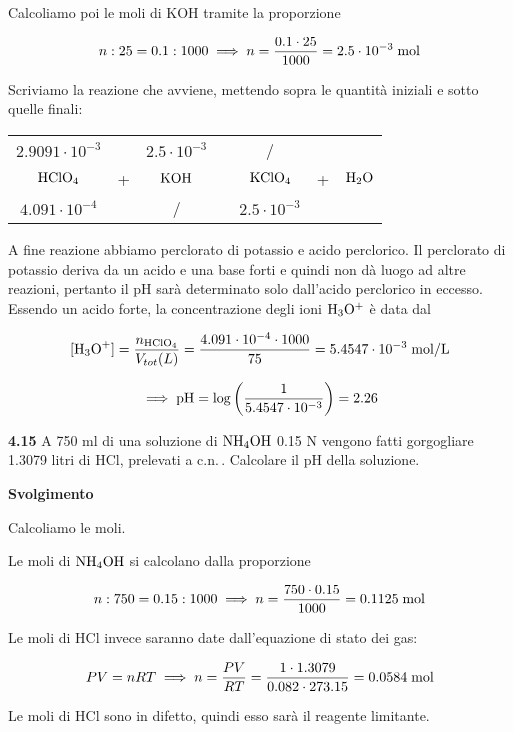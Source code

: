 Calcoliamo poi le moli di KOH tramite la proporzione

$$n:25=0.1:1000
\implies
n=\frac{0.1 \cdot 25}{1000}
=2.5 \cdot 10^{-3} \; \rm mol$$

Scriviamo la reazione che avviene, mettendo sopra le quantità iniziali e sotto quelle finali:

\begin{center}
    \begin{tabular}{ccccccc}
        $2.9091 \cdot 10^{-3}$ &  & $2.5 \cdot 10^{-3}$ & & / &&\\
        $\rm HClO_4$ & + & $\rm KOH$ & \ce{->} & $\rm KClO_4$ & + & $\rm H_2O$\\
        $4.091 \cdot 10^{-4}$ &  & / & & $2.5 \cdot 10^{-3}$ &&\\
    \end{tabular}
\end{center}

A fine reazione abbiamo perclorato di potassio e acido perclorico. Il perclorato di potassio deriva da un acido e una base forti e quindi non dà luogo ad altre reazioni, pertanto il pH sarà determinato solo dall'acido perclorico in eccesso. Essendo un acido forte, la concentrazione degli ioni $\rm H_3O^+$ è data dal

$$[\text{H}_3\text{O}^+]=\frac{n_{\rm HClO_4}}{V_{tot}(L)}=\frac{4.091 \cdot 10^{-4} \cdot 1000}{75}=5.4547 \cdot 10^{-3} \; \rm mol/L$$

$$\implies \rm pH=\log{\left(\frac{1}{5.4547 \cdot 10^{-3}}\right)}=2.26$$

\vspace{0.2cm}\textbf{4.15} A 750 ml di una soluzione di $\rm NH_4OH$ 0.15 N vengono fatti gorgogliare 1.3079 litri di HCl, prelevati a c.n.\,. Calcolare il pH della soluzione.

\vspace{0.2cm}\large\textbf{Svolgimento}\normalsize

\vspace{0.2cm}Calcoliamo le moli.

Le moli di $\rm NH_4OH$ si calcolano dalla proporzione

$$n:750=0.15:1000
\implies
n=\frac{750 \cdot 0.15}{1000}
=0.1125 \; \rm mol$$

Le moli di HCl invece saranno date dall'equazione di stato dei gas:

$$PV=nRT \implies n=\frac{PV}{RT}
=\frac{1 \cdot 1.3079}{0.082 \cdot 273.15}
=0.0584 \; \rm mol$$

Le moli di HCl sono in difetto, quindi esso sarà il reagente limitante.

